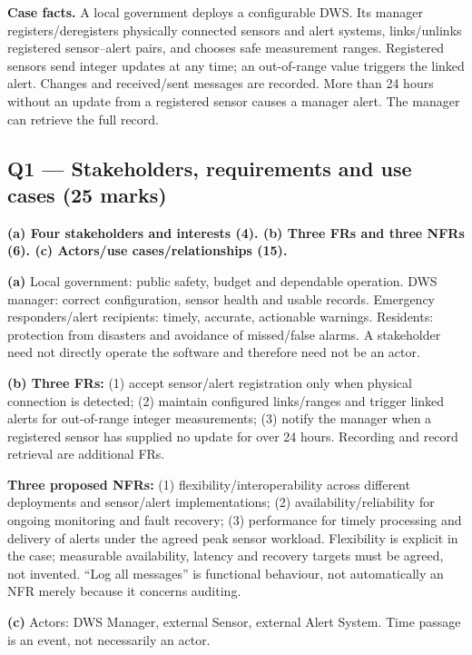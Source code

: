 \begin{studycolumns}
\vspace{0pt}
\textbf{Case facts.} A local government deploys a configurable DWS. Its manager registers/\allowbreak{}deregisters physically connected sensors and alert systems, links/\allowbreak{}unlinks registered sensor--alert pairs, and chooses safe measurement ranges. Registered sensors send integer updates at any time; an out-of-range value triggers the linked alert. Changes and received/\allowbreak{}sent messages are recorded. More than 24 hours without an update from a registered sensor causes a manager alert. The manager can retrieve the full record.

\subsection*{Q1 --- Stakeholders, requirements and use cases (25 marks)}
\textbf{(a) Four stakeholders and interests (4). (b) Three FRs and three NFRs (6). (c) Actors/\allowbreak{}use cases/\allowbreak{}relationships (15).}


\textbf{(a)} Local government: public safety, budget and dependable operation. DWS manager: correct configuration, sensor health and usable records. Emergency responders/\allowbreak{}alert recipients: timely, accurate, actionable warnings. Residents: protection from disasters and avoidance of missed/\allowbreak{}false alarms. A stakeholder need not directly operate the software and therefore need not be an actor.

\textbf{(b) Three FRs:} (1) accept sensor/\allowbreak{}alert registration only when physical connection is detected; (2) maintain configured links/\allowbreak{}ranges and trigger linked alerts for out-of-range integer measurements; (3) notify the manager when a registered sensor has supplied no update for over 24 hours. Recording and record retrieval are additional FRs.

\textbf{Three proposed NFRs:} (1) flexibility/\allowbreak{}interoperability across different deployments and sensor/\allowbreak{}alert implementations; (2) availability/\allowbreak{}reliability for ongoing monitoring and fault recovery; (3) performance for timely processing and delivery of alerts under the agreed peak sensor workload. Flexibility is explicit in the case; measurable availability, latency and recovery targets must be agreed, not invented. ``Log all messages'' is functional behaviour, not automatically an NFR merely because it concerns auditing.

\textbf{(c)} Actors: DWS Manager, external Sensor, external Alert System. Time passage is an event, not necessarily an actor.
\end{studycolumns}


